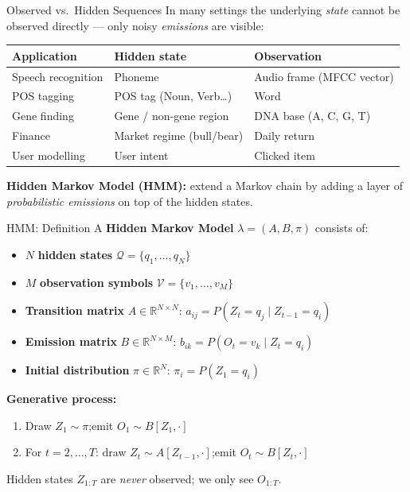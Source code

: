 \documentclass[aspectratio=169,t]{beamer}
\begin{document}

\begin{frame}{Observed vs.\ Hidden Sequences}
  In many settings the underlying \emph{state} cannot be observed directly — only noisy
  \emph{emissions} are visible:
  \vspace{0.15cm}
  \begin{center}
  \renewcommand{\arraystretch}{1.3}
  \begin{tabular}{lll}
    \toprule
    \textbf{Application} & \textbf{Hidden state} & \textbf{Observation} \\
    \midrule
    Speech recognition   & Phoneme               & Audio frame (MFCC vector) \\
    POS tagging          & POS tag (Noun, Verb\ldots) & Word \\
    Gene finding         & Gene / non-gene region & DNA base (A, C, G, T) \\
    Finance              & Market regime (bull/bear) & Daily return \\
    User modelling       & User intent            & Clicked item \\
    \bottomrule
  \end{tabular}
  \end{center}
  \vspace{0.2cm}
  \textbf{Hidden Markov Model (HMM):} extend a Markov chain by adding a layer of
  \emph{probabilistic emissions} on top of the hidden states.
\end{frame}

\begin{frame}{HMM: Definition}
  A \textbf{Hidden Markov Model} $\lambda = (A, B, \pi)$ consists of:
  \begin{itemize}
    \item $N$ \textbf{hidden states} $\mathcal{Q} = \{q_1, \ldots, q_N\}$
    \item $M$ \textbf{observation symbols} $\mathcal{V} = \{v_1, \ldots, v_M\}$
    \item \textbf{Transition matrix} $A \in \mathbb{R}^{N\times N}$:\;
          $a_{ij} = P(Z_t = q_j \mid Z_{t-1} = q_i)$
    \item \textbf{Emission matrix} $B \in \mathbb{R}^{N\times M}$:\;
          $b_{ik} = P(O_t = v_k \mid Z_t = q_i)$
    \item \textbf{Initial distribution} $\pi \in \mathbb{R}^N$:\;
          $\pi_i = P(Z_1 = q_i)$
  \end{itemize}
  \vspace{0.25cm}
  \textbf{Generative process:}
  \begin{enumerate}
    \item Draw $Z_1 \sim \pi$;\quad emit $O_1 \sim B[Z_1,\cdot]$
    \item For $t = 2, \ldots, T$: draw $Z_t \sim A[Z_{t-1},\cdot]$;\quad emit $O_t \sim B[Z_t,\cdot]$
  \end{enumerate}
  Hidden states $Z_{1:T}$ are \emph{never} observed; we only see $O_{1:T}$.
\end{frame}
\end{document}
